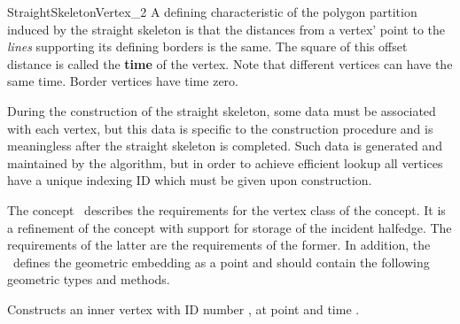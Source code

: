 \begin{ccRefConcept}{StraightSkeletonVertex_2}
A defining characteristic of the polygon partition induced by the straight skeleton is that the distances from a vertex' point to the \textit{lines} supporting its defining borders is the same. The square of this offset distance is called the \textbf{time} of the vertex. Note that different vertices can have the same time. Border vertices have time zero.

During the construction of the straight skeleton, some data must be associated with each vertex, but this data is specific to the construction procedure and is meaningless after the straight skeleton is completed. Such data is generated and maintained by the algorithm, but in order to achieve efficient lookup all vertices have a unique indexing ID which must be given upon construction.

\ccDefinition

The concept \ccRefName\ describes the requirements for the vertex class of the
 concept. It is a refinement of the  concept
with support for storage of the incident halfedge. The requirements of the latter are the requirements of the former. In addition, the \ccRefName\ defines the geometric embedding as a point and should contain the following geometric types and methods.

\ccTypes
\ccGlue
\ccGlue
\ccGlue
\ccGlue
\ccGlue

\ccCreation
{}  %

\ccGlue
{}
\ccGlue
{}
{Constructs an inner vertex with ID number , at point  and time .}


\end{ccRefConcept}

